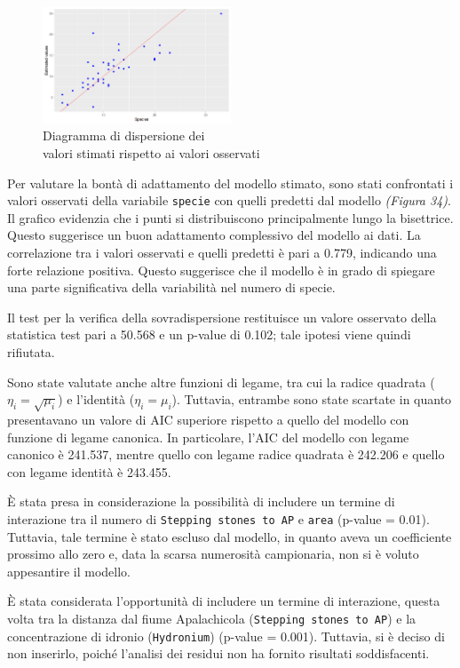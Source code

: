 \documentclass{article} %
\begin{document}
\begin{figure}[H]
    \centering
    \includegraphics[width=0.5\textwidth]{immagini/res_val_oss_glm.png}
    \captionsetup{justification=centering}
    \caption{Diagramma di dispersione dei \\valori stimati rispetto ai valori osservati}
\end{figure}

Per valutare la bontà di adattamento del modello stimato, sono stati confrontati i valori osservati della variabile \texttt{specie} con quelli predetti dal modello \textit{(Figura 34)}. Il grafico evidenzia che i punti si distribuiscono principalmente lungo la bisettrice. Questo suggerisce un buon adattamento complessivo del modello ai dati. La correlazione tra i valori osservati e quelli predetti è pari a 0.779, indicando una forte relazione positiva. Questo suggerisce che il modello è in grado di spiegare una parte significativa della variabilità nel numero di specie.

Il test per la verifica della sovradispersione restituisce un valore osservato della statistica test pari a 50.568 e un p-value di 0.102; tale ipotesi viene quindi rifiutata.  

Sono state valutate anche altre funzioni di legame, tra cui la radice quadrata ($\eta_i=\sqrt{\mu_i}$) e l'identità ($\eta_i=\mu_i$). Tuttavia, entrambe sono state scartate in quanto presentavano un valore di AIC superiore rispetto a quello del modello con funzione di legame canonica. In particolare, l'AIC del modello con legame canonico è 241.537, mentre quello con legame radice quadrata è 242.206 e quello con legame identità è 243.455.

È stata presa in considerazione la possibilità di includere un termine di interazione tra il numero di \texttt{Stepping stones to AP} e \texttt{area} (p-value = 0.01). Tuttavia, tale termine è stato escluso dal modello, in quanto aveva un coefficiente prossimo allo zero e, data la scarsa numerosità campionaria, non si è voluto appesantire il modello.

È stata considerata l'opportunità di includere un termine di interazione, questa volta tra la distanza dal fiume Apalachicola (\texttt{Stepping stones to AP}) e la concentrazione di idronio (\texttt{Hydronium}) (p-value = 0.001). Tuttavia, si è deciso di non inserirlo, poiché l'analisi dei residui non ha fornito risultati soddisfacenti.
\end{document}
